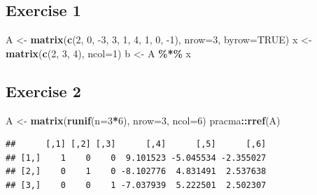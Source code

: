 \documentclass[
]{book}
\newenvironment{Shaded}{\begin{snugshade}}{\end{snugshade}}
\newcommand{\DataTypeTok}[1]{\textcolor[rgb]{0.13,0.29,0.53}{#1}}
\newcommand{\DecValTok}[1]{\textcolor[rgb]{0.00,0.00,0.81}{#1}}
\newcommand{\KeywordTok}[1]{\textcolor[rgb]{0.13,0.29,0.53}{\textbf{#1}}}
\newcommand{\NormalTok}[1]{#1}
\newcommand{\OperatorTok}[1]{\textcolor[rgb]{0.81,0.36,0.00}{\textbf{#1}}}
\newcommand{\OtherTok}[1]{\textcolor[rgb]{0.56,0.35,0.01}{#1}}
\newcommand{\StringTok}[1]{\textcolor[rgb]{0.31,0.60,0.02}{#1}}
\begin{document}
\hypertarget{exercise-1-6}{%
\subsection*{Exercise 1}\label{exercise-1-6}}

\begin{Shaded}
\begin{Highlighting}[]
\NormalTok{A \textless{}{-}}\StringTok{ }\KeywordTok{matrix}\NormalTok{(}\KeywordTok{c}\NormalTok{(}\DecValTok{2}\NormalTok{, }\DecValTok{0}\NormalTok{, }\DecValTok{{-}3}\NormalTok{, }\DecValTok{3}\NormalTok{, }\DecValTok{1}\NormalTok{, }\DecValTok{4}\NormalTok{, }\DecValTok{1}\NormalTok{, }\DecValTok{0}\NormalTok{, }\DecValTok{{-}1}\NormalTok{), }\DataTypeTok{nrow=}\DecValTok{3}\NormalTok{, }\DataTypeTok{byrow=}\OtherTok{TRUE}\NormalTok{)}
\NormalTok{x \textless{}{-}}\StringTok{ }\KeywordTok{matrix}\NormalTok{(}\KeywordTok{c}\NormalTok{(}\DecValTok{2}\NormalTok{, }\DecValTok{3}\NormalTok{, }\DecValTok{4}\NormalTok{), }\DataTypeTok{ncol=}\DecValTok{1}\NormalTok{)}
\NormalTok{b \textless{}{-}}\StringTok{ }\NormalTok{A }\OperatorTok{\%*\%}\StringTok{ }\NormalTok{x}
\end{Highlighting}
\end{Shaded}

\hypertarget{exercise-2-6}{%
\subsection*{Exercise 2}\label{exercise-2-6}}

\begin{Shaded}
\begin{Highlighting}[]
\NormalTok{A \textless{}{-}}\StringTok{ }\KeywordTok{matrix}\NormalTok{(}\KeywordTok{runif}\NormalTok{(}\DataTypeTok{n=}\DecValTok{3}\OperatorTok{*}\DecValTok{6}\NormalTok{), }\DataTypeTok{nrow=}\DecValTok{3}\NormalTok{, }\DataTypeTok{ncol=}\DecValTok{6}\NormalTok{)}
\NormalTok{pracma}\OperatorTok{::}\KeywordTok{rref}\NormalTok{(A)}
\end{Highlighting}
\end{Shaded}

\begin{verbatim}
##      [,1] [,2] [,3]      [,4]      [,5]      [,6]
## [1,]    1    0    0  9.101523 -5.045534 -2.355027
## [2,]    0    1    0 -8.102776  4.831491  2.537638
## [3,]    0    0    1 -7.037939  5.222501  2.502307
\end{verbatim}
\end{document}
